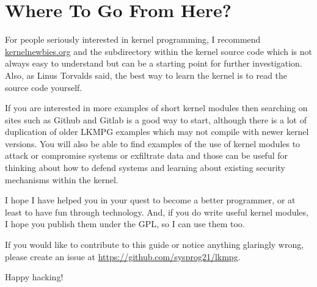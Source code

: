 \documentclass[10pt, oneside]{book}
\begin{document}
\section{Where To Go From Here?}
\label{sec:where_to_go}
For people seriously interested in kernel programming, I recommend \href{https://kernelnewbies.org}{kernelnewbies.org} and the  subdirectory within the kernel source code which is not always easy to understand but can be a starting point for further investigation.
Also, as Linus Torvalds said, the best way to learn the kernel is to read the source code yourself.

If you are interested in more examples of short kernel modules then searching on sites such as Github and Gitlab is a good way to start, although there is a lot of duplication of older LKMPG examples which may not compile with newer kernel versions.
You will also be able to find examples of the use of kernel modules to attack or compromise systems or exfiltrate data and those can be useful for thinking about how to defend systems and learning about existing security mechanisms within the kernel.

I hope I have helped you in your quest to become a better programmer, or at least to have fun through technology.
And, if you do write useful kernel modules, I hope you publish them under the GPL, so I can use them too.

If you would like to contribute to this guide or notice anything glaringly wrong, please create an issue at \url{https://github.com/sysprog21/lkmpg}.

Happy hacking!
\end{document}
